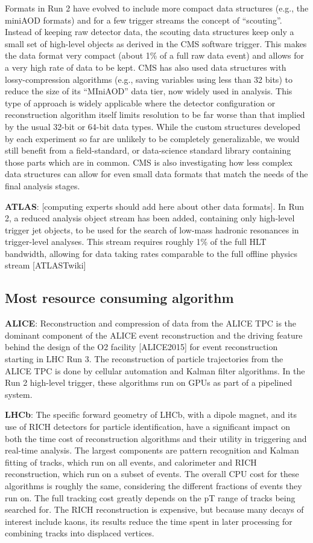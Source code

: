 Formats in Run 2 have evolved to include more compact data structures (e.g., the miniAOD formats) and for a few trigger streams the concept of “scouting”. Instead of keeping raw detector data, the scouting data structures keep only a small set of high-level objects as derived in the CMS software trigger. This makes the data format very compact (about 1\% of a full raw data event) and allows for a very high rate of data to be kept. CMS has also used data structures with lossy-compression algorithms (e.g., saving variables using less than 32 bits) to reduce the size of its “MIniAOD” data tier, now widely used in analysis. This type of approach is widely applicable where the detector configuration or reconstruction algorithm itself limits resolution to be far worse than that implied by the usual 32-bit or 64-bit data types. While the custom structures developed by each experiment so far are unlikely to be completely generalizable, we would still benefit from a field-standard, or data-science standard library containing those parts which are in common.  CMS is also investigating how less complex data structures can allow for even small data formats that match the needs of the final analysis stages.

\vskip 0.5cm
\noindent
{\bf ATLAS}: [computing experts should add here about other data formats]. In Run 2, a reduced analysis object stream has been added, containing only high-level trigger jet objects, to be used for the search of low-mass hadronic resonances in trigger-level analyses. This stream requires roughly 1\% of the full HLT bandwidth, allowing for data taking rates comparable to the full offline physics stream [ATLASTwiki] 

\subsection{Most resource consuming algorithm}
{\bf ALICE}: Reconstruction and compression of data from the ALICE TPC is the dominant component of the ALICE event reconstruction and the driving feature behind the design of the O2 facility [ALICE2015] for event reconstruction starting in LHC Run 3. The reconstruction of particle trajectories from the ALICE TPC is done by cellular automation and Kalman filter algorithms. In the Run 2 high-level trigger, these algorithms run on GPUs as part of a pipelined system.

\vskip 0.5cm
\noindent
{\bf LHCb}: The specific forward geometry of LHCb, with a dipole magnet, and its use of RICH detectors for particle identification, have a significant impact on both the time cost of reconstruction algorithms and their utility in triggering and real-time analysis. The largest components are pattern recognition and Kalman fitting of tracks, which run on all events, and calorimeter and RICH reconstruction, which run on a subset of events. The overall CPU cost for these algorithms is roughly the same, considering the different fractions of events they run on. The full tracking cost greatly depends on the pT range of tracks being searched for. The RICH reconstruction is expensive, but because many decays of interest include kaons, its results reduce the time spent in later processing for combining tracks into displaced vertices.

